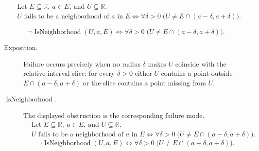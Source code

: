 \begin{remark*}
\[
\begin{aligned}
&\text{Let } E \subseteq \mathbb{R},\ a \in E,\ \text{and } U \subseteq \mathbb{R}.\\
&U \text{ fails to be a neighborhood of } a \text{ in } E
\Longleftrightarrow
\forall \delta > 0\; \bigl(U \ne E \cap (a-\delta, a+\delta)\bigr).
\end{aligned}
\]
\end{remark*}

\begin{remark*}
\[
\neg \operatorname{IsNeighborhood}(U,a,E)
\Longleftrightarrow
\forall \delta > 0\;
\bigl(U \ne E \cap (a-\delta, a+\delta)\bigr).
\]
\end{remark*}

\begin{remark*}
\begin{description}
  \item[Exposition.]
Failure occurs precisely when no radius $\delta$ makes $U$ coincide with the relative interval slice: for every $\delta > 0$ either $U$ contains a point outside $E \cap (a-\delta,a+\delta)$ or the slice contains a point missing from $U$.


  \item[\(\operatorname{IsNeighborhood}.\)]
  The displayed obstruction is the corresponding failure mode.
  \[
\begin{aligned}
&\text{Let } E \subseteq \mathbb{R},\ a \in E,\ \text{and } U \subseteq \mathbb{R}.\\
&U \text{ fails to be a neighborhood of } a \text{ in } E
\Longleftrightarrow
\forall \delta > 0\; \bigl(U \ne E \cap (a-\delta, a+\delta)\bigr).
\end{aligned}
  \]
  \[
\neg \operatorname{IsNeighborhood}(U,a,E)
\Longleftrightarrow
\forall \delta > 0\;
\bigl(U \ne E \cap (a-\delta, a+\delta)\bigr).
  \]
\end{description}
\end{remark*}


